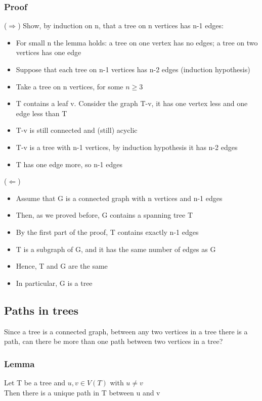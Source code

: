 \documentclass{article}[18pt]
\begin{document}
\subsubsection{Proof}
($\Rightarrow$) Show, by induction on n, that a tree on n vertices has n-1 edges:
\begin{itemize}
	\item For small n the lemma holds: a tree on one vertex has no edges; a tree on two vertices has one edge
	\item Suppose that each tree on n-1 vertices has n-2 edges (induction hypothesis)
	\item Take a tree on n vertices, for some $n\geqslant 3$
	\item T contains a leaf v. Consider the graph T-v, it has one vertex less and one edge less than T
	\item T-v is still connected and (still) acyclic
	\item T-v is a tree with n-1 vertices, by induction hypothesis it has n-2 edges
	\item T has one edge more, so n-1 edges
\end{itemize}
($\Leftarrow$)
\begin{itemize}
	\item Assume that G is a connected graph with n vertices and n-1 edges
	\item Then, as we proved before, G contains a spanning tree T
	\item By the first part of the proof, T contains exactly n-1 edges
	\item T is a subgraph of G, and it has the same number of edges as G
	\item Hence, T and G are the same
	\item In particular, G is a tree
\end{itemize}
\subsection{Paths in trees}
Since a tree is a connected graph, between any two vertices in a tree there is a path, can there be more than one path between two vertices in a tree?
\subsubsection{Lemma}
Let T be a tree and $u,v\in V(T)$ with $u\neq v$\\
Then there is a unique path in T between u and v
\end{document}
